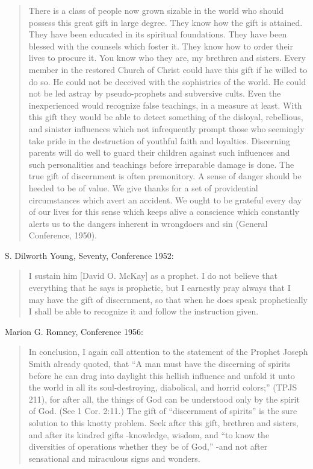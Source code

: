 \begin{enumerate}
\begin{quotation}
There is a class of people now grown sizable in the world who should possess this great gift in large degree. They know how the gift is attained. They have been educated in its spiritual foundations. They have been blessed with the counsels which foster it. They know how to order their lives to procure it. You know who they are, my brethren and sisters. Every member in the restored Church of Christ could have this gift if he willed to do so. He could not be deceived with the sophistries of the world. He could not be led astray by pseudo-prophets and subversive cults. Even the inexperienced would recognize false teachings, in a measure at least. With this gift they would be able to detect something of the disloyal, rebellious, and sinister influences which not infrequently prompt those who seemingly take pride in the destruction of youthful faith and loyalties. Discerning parents will do well to guard their children against such influences and such personalities and teachings before irreparable damage is done. The true gift of discernment is often premonitory. A sense of danger should be heeded to be of value. We give thanks for a set of providential circumstances which avert an accident. We ought to be grateful every day of our lives for this sense which keeps alive a conscience which constantly alerts us to the dangers inherent in wrongdoers and sin (General Conference, 1950).
\end{quotation}

S. Dilworth Young, Seventy, Conference 1952:

\begin{quotation}
I sustain him [David O. McKay] as a prophet. I do not believe that everything that he says is prophetic, but I earnestly pray always that I may have the gift of discernment, so that when he does speak prophetically I shall be able to recognize it and follow the instruction given.
\end{quotation}

Marion G. Romney, Conference 1956:

\begin{quotation}
In conclusion, I again call attention to the statement of the Prophet Joseph Smith already quoted, that ``A man must have the discerning of spirits before he can drag into daylight this hellish influence and unfold it unto the world in all its soul-destroying, diabolical, and horrid colors;'' (TPJS 211), for after all, the things of God can be understood only by the spirit of God. (See 1 Cor. 2:11.) The gift of ``discernment of spirits'' is the sure solution to this knotty problem. Seek after this gift, brethren and sisters, and after its kindred gifts -knowledge, wisdom, and ``to know the diversities of operations whether they be of God,'' -and not after sensational and miraculous signs and wonders.
\end{quotation}


\end{enumerate}
